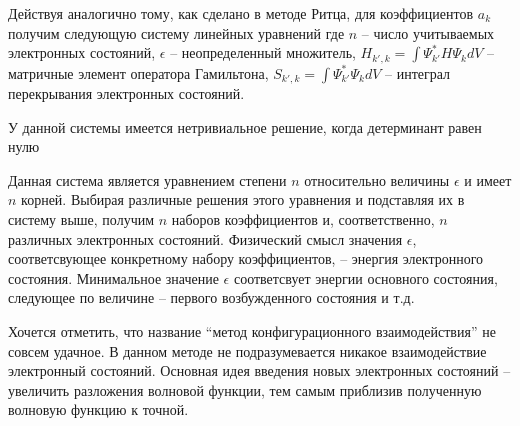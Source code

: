 Действуя аналогично тому, как сделано в методе Ритца, для коэффициентов $a_k$ получим следующую систему линейных уравнений
где $n$ -- число учитываемых электронных состояний, $\epsilon$ -- неопределенный множитель, $H_{k', k} = \int\Psi_{k'}^{\ast}H\Psi_{k}dV$ -- матричные элемент оператора Гамильтона, $S_{k', k} = \int\Psi_{k'}^{\ast}\Psi_{k}dV$ -- интеграл перекрывания электронных состояний.

У данной системы имеется нетривиальное решение, когда детерминант равен нулю

Данная система является уравнением степени $n$ относительно величины $\epsilon$ и имеет $n$ корней. Выбирая различные решения этого уравнения и подставляя их в систему выше, получим $n$ наборов коэффициентов и, соответственно, $n$ различных электронных состояний. Физический смысл значения $\epsilon$, соответсвующее конкретному набору коэффициентов, -- энергия электронного состояния. Минимальное значение $\epsilon$ соответсвует энергии основного состояния, следующее по величине -- первого возбужденного состояния и т.д.

Хочется отметить, что название “метод конфигурационного взаимодействия” не совсем удачное. В данном методе не подразумевается никакое взаимодействие электронный состояний. Основная идея введения новых электронных состояний -- увеличить разложения волновой функции, тем самым приблизив полученную волновую функцию к точной.